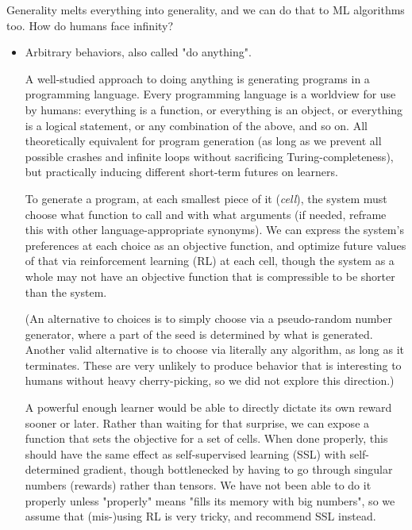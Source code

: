 \documentclass{article}
\begin{document}
Generality melts everything into generality, and we can do that to ML algorithms too. How do humans face infinity?

\begin{itemize}
\item Arbitrary behaviors, also called "do anything".

A well-studied approach to doing anything is generating programs in a programming language. Every programming language is a worldview for use by humans: everything is a function, or everything is an object, or everything is a logical statement, or any combination of the above, and so on. All theoretically equivalent for program generation (as long as we prevent all possible crashes and infinite loops without sacrificing Turing-completeness), but practically inducing different short-term futures on learners.

To generate a program, at each smallest piece of it (\textit{cell}), the system must choose what function to call and with what arguments (if needed, reframe this with other language-appropriate synonyms). We can express the system's preferences at each choice as an objective function, and optimize future values of that via reinforcement learning (RL) at each cell, though the system as a whole may not have an objective function that is compressible to be shorter than the system.

(An alternative to choices is to simply choose via a pseudo-random number generator, where a part of the seed is determined by what is generated. Another valid alternative is to choose via literally any algorithm, as long as it terminates. These are very unlikely to produce behavior that is interesting to humans without heavy cherry-picking, so we did not explore this direction.)

A powerful enough learner would be able to directly dictate its own reward sooner or later. Rather than waiting for that surprise, we can expose a function that sets the objective for a set of cells. When done properly, this should have the same effect as self-supervised learning (SSL) with self-determined gradient, though bottlenecked by having to go through singular numbers (rewards) rather than tensors. We have not been able to do it properly unless "properly" means "fills its memory with big numbers", so we assume that (mis-)using RL is very tricky, and recommend SSL instead.


\end{itemize}
\end{document}
